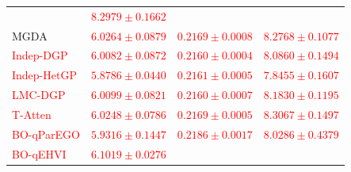 \documentclass[11pt]{article}
\begin{document}
\begin{table}[!htbp]
\begin{tabular*}{\textwidth}{@{\extracolsep{\fill}}lccc}
		                                                        & \textcolor{red}{$8.2979 \pm 0.1662$}\\%
		MGDA                                                    & \textcolor{red}{$6.0264 \pm 0.0879$}%
		                                                        & \textcolor{red}{$0.2169 \pm 0.0008$}%
		                                                        & \textcolor{red}{$8.2768 \pm 0.1077$}\\%
		\textcolor{red}{Indep-DGP}%
		                                                        & \textcolor{red}{$6.0082 \pm 0.0872$}%
		                                                        & \textcolor{red}{$\mathbf{0.2160 \pm 0.0004}$}%
		                                                        & \textcolor{red}{$8.0860 \pm 0.1494$}\\%
		\textcolor{red}{Indep-HetGP}%
		                                                        & \textcolor{red}{$5.8786 \pm 0.0440$}%
		                                                        & \textcolor{red}{$0.2161 \pm 0.0005$}%
		                                                        & \textcolor{red}{$\mathbf{7.8455 \pm 0.1607}$}\\%
		\textcolor{red}{LMC-DGP}%
		                                                        & \textcolor{red}{$6.0099 \pm 0.0821$}%
		                                                        & \textcolor{red}{$0.2160 \pm 0.0007$}%
		                                                        & \textcolor{red}{$8.1830 \pm 0.1195$}\\%
		\textcolor{red}{T-Atten}%
		                                                        & \textcolor{red}{$6.0248 \pm 0.0786$}%
		                                                        & \textcolor{red}{$0.2169 \pm 0.0005$}%
		                                                        & \textcolor{red}{$8.3067 \pm 0.1497$}\\%
		\midrule
		\textcolor{red}{BO-qParEGO}%
		                                                        & \textcolor{red}{$5.9316 \pm 0.1447$}%
		                                                        & \textcolor{red}{$0.2186 \pm 0.0017$}%
		                                                        & \textcolor{red}{$8.0286 \pm 0.4379$}\\%
		\textcolor{red}{BO-qEHVI}%
		                                                        & \textcolor{red}{$6.1019 \pm 0.0276$}%

\end{tabular*}
\end{table}
\end{document}

